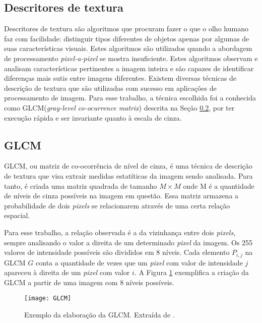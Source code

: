 \subsection{Descritores de textura}\label{sec:descritores}

Descritores de textura são algoritmos que procuram fazer o que o olho humano faz com facilidade: distinguir tipos diferentes de objetos apenas por algumas de suas características visuais. Estes algoritmos são utilizados quando a abordagem de processamento \textit{pixel-a-pixel} se mostra insuficiente. Estes algoritmos observam e analisam características pertinentes a imagem inteira e são capazes de identificar diferenças mais sutis entre imagens diferentes. Existem diversas técnicas de descrição de textura que são utilizadas com sucesso em aplicações de processamento de imagem. Para esse trabalho, a técnica escolhida foi a conhecida como GLCM(\textit{gray-level co-ocurrence matrix}) descrita na Seção \ref{sec:GLCM}, por ter execução rápida e ser invariante quanto à escala de cinza.

\subsection{GLCM}\label{sec:GLCM}

GLCM, ou matriz de co-ocorrência de nível de cinza, é uma técnica de descrição de textura que visa extrair medidas estatíticas da imagem sendo analisada. Para tanto, é criada uma matriz quadrada de tamanho $M\times M$ onde M é a quantidade de níveis de cinza possíveis na imagem em questão. Essa matriz armazena a probabilidade de dois \textit{pixels} se relacionarem através de uma certa relação espacial\cite{GLCM}. 

Para esse trabalho, a relação observada é a da vizinhança entre dois \textit{pixels}, sempre analisando o valor a direita de um determinado \textit{pixel} da imagem. Os 255 valores de intensidade possíveis são divididos em 8 níveis. Cada elemento $P_{i,j}$ na GLCM $G$ conta a quantidade de vezes que um \textit{pixel} com valor de intensidade  $j$ apareceu à direita de um \textit{pixel} com valor $i$. A Figura \ref{fig:GLCM} exemplifica a criação da GLCM a partir de uma imagem com 8 níveis possíveis.

\begin{figure}
\texttt{[image: GLCM]} 
\centering
\caption{Exemplo da elaboração da GLCM. Extraída de \cite{matlab}.}
\label{fig:GLCM}
\centering
\end{figure}

